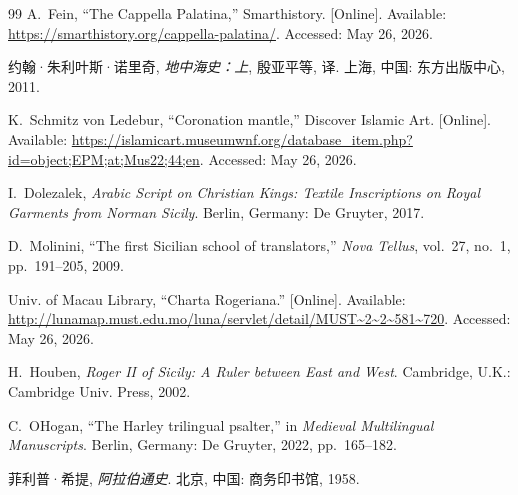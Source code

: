 \documentclass[UTF8,a4paper,12pt]{ctexart}
\begin{document}
\begin{thebibliography}{99}
A.~Fein, ``The Cappella Palatina,'' Smarthistory. [Online]. Available: \url{https://smarthistory.org/cappella-palatina/}. Accessed: May 26, 2026.

约翰·朱利叶斯·诺里奇, \emph{地中海史：上}, 殷亚平等, 译. 上海, 中国: 东方出版中心, 2011.

K.~Schmitz von Ledebur, ``Coronation mantle,'' Discover Islamic Art. [Online]. Available: \url{https://islamicart.museumwnf.org/database_item.php?id=object;EPM;at;Mus22;44;en}. Accessed: May 26, 2026.

I.~Dolezalek, \emph{Arabic Script on Christian Kings: Textile Inscriptions on Royal Garments from Norman Sicily}. Berlin, Germany: De Gruyter, 2017.

D.~Molinini, ``The first Sicilian school of translators,'' \emph{Nova Tellus}, vol.~27, no.~1, pp.~191--205, 2009.

Univ. of Macau Library, ``Charta Rogeriana.'' [Online]. Available: \url{http://lunamap.must.edu.mo/luna/servlet/detail/MUST~2~2~581~720}. Accessed: May 26, 2026.

H.~Houben, \emph{Roger II of Sicily: A Ruler between East and West}. Cambridge, U.K.: Cambridge Univ. Press, 2002.

C.~O{\textquotesingle}Hogan, ``The Harley trilingual psalter,'' in \emph{Medieval Multilingual Manuscripts}. Berlin, Germany: De Gruyter, 2022, pp.~165--182.

菲利普·希提, \emph{阿拉伯通史}. 北京, 中国: 商务印书馆, 1958.

\end{thebibliography}
\end{document}
